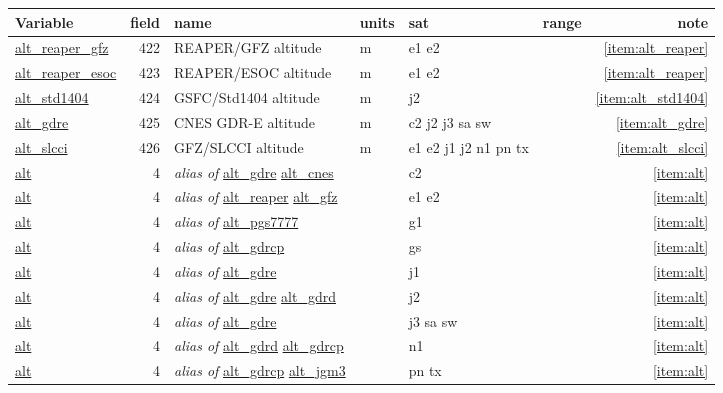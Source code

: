 \documentclass[a4paper,11pt,openany,natbib,nomargin]{thesis}
\makeatletter
\newcommand\var[1]{\url{#1}\index{variables!#1@\protect\url{#1}}}
\newcommand\alias[1]{\emph{alias of} \var{#1}}
\newenvironment{vartable}{
\begin{table}[ht]
\small
\begin{tabular}{lrllllr}
\hline
Variable & field & name & units & sat & range & note \\
\hline
}{
\hline
\end{tabular}
\end{table}
}
\makeatother
\begin{document}
\begin{vartable}
\var{alt_reaper_gfz}  & 422 & REAPER/GFZ altitude & m & e1 e2 && \ref{item:alt_reaper} \\
\var{alt_reaper_esoc} & 423 & REAPER/ESOC altitude & m & e1 e2 && \ref{item:alt_reaper} \\
\var{alt_std1404}  & 424 & GSFC/Std1404 altitude & m & j2 && \ref{item:alt_std1404} \\
\var{alt_gdre}     & 425 & CNES GDR-E altitude & m & c2 j2 j3 sa sw && \ref{item:alt_gdre} \\
\var{alt_slcci}    & 426 & GFZ/SLCCI altitude & m & e1 e2 j1 j2 n1 pn tx && \ref{item:alt_slcci} \\
\hline
\var{alt} & 4 & \alias{alt_gdre} \var{alt_cnes} & & c2 && \ref{item:alt}\\
\var{alt} & 4 & \alias{alt_reaper} \var{alt_gfz} & & e1 e2 && \ref{item:alt} \\
\var{alt} & 4 & \alias{alt_pgs7777} & & g1 && \ref{item:alt} \\
\var{alt} & 4 & \alias{alt_gdrcp} & & gs && \ref{item:alt} \\
\var{alt} & 4 & \alias{alt_gdre} & & j1 && \ref{item:alt} \\
\var{alt} & 4 & \alias{alt_gdre} \var{alt_gdrd} & & j2 && \ref{item:alt} \\
\var{alt} & 4 & \alias{alt_gdre} & & j3 sa sw && \ref{item:alt} \\
\var{alt} & 4 & \alias{alt_gdrd} \var{alt_gdrcp} & & n1 && \ref{item:alt} \\
\var{alt} & 4 & \alias{alt_gdrcp} \var{alt_jgm3} & & pn tx && \ref{item:alt} \\
\end{vartable}
\end{document}
